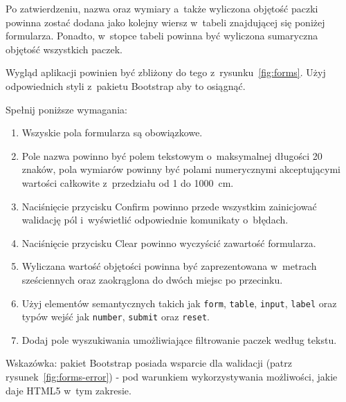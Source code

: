 \documentclass[12pt]{article}
\begin{document}
\begin{enumerate}
            Po zatwierdzeniu, nazwa oraz wymiary a~także wyliczona objętość paczki powinna zostać dodana jako kolejny wiersz w~tabeli znajdującej się poniżej formularza.
            Ponadto, w~stopce tabeli powinna być wyliczona sumaryczna objętość wszystkich paczek.

            Wygląd aplikacji powinien być zbliżony do tego z~rysunku~\ref{fig:forms}.
            Użyj odpowiednich styli z~pakietu Bootstrap aby to osiągnąć.

            Spełnij poniższe wymagania:
            \begin{enumerate}
                \item Wszyskie pola formularza są obowiązkowe.
                \item Pole nazwa powinno być polem tekstowym o~maksymalnej długości 20 znaków, pola wymiarów powinny być polami numerycznymi akceptującymi wartości całkowite z~przedziału od 1 do 1000~cm.
                \item Naciśnięcie przycisku Confirm powinno przede wszystkim zainicjować walidację pól i~wyświetlić odpowiednie komunikaty o~błędach.
                \item Naciśnięcie przycisku Clear powinno wyczyścić zawartość formularza.
                \item Wyliczana wartość objętości powinna być zaprezentowana w~metrach sześciennych oraz zaokrąglona do dwóch miejsc po przecinku.
                \item Użyj elementów semantycznych takich jak \texttt{form}, \texttt{table}, \texttt{input}, \texttt{label} oraz typów wejść jak \texttt{number}, \texttt{submit} oraz \texttt{reset}.
                \item Dodaj pole wyszukiwania umożliwiające filtrowanie paczek według tekstu.
            \end{enumerate}

            Wskazówka: pakiet Bootstrap posiada wsparcie dla walidacji (patrz rysunek~\ref{fig:forms-error}) - pod warunkiem wykorzystywania możliwości, jakie daje HTML5 w~tym zakresie.


\end{enumerate}
\end{document}
